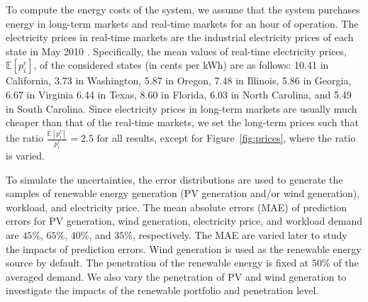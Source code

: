 To compute the energy costs of the system, we assume that the system
purchases energy in long-term markets and real-time markets for an
hour of operation. The
electricity prices in real-time markets are the industrial electricity
prices of each state in May 2010 \cite{eia2015}. Specifically, the
mean values of real-time electricity prices, $\mathbb{E}[p^r_i]$, of
the considered states (in cents per kWh) are as follows: 10.41 in
California, 3.73 in Washington, 5.87 in Oregon, 7.48 in Illinois, 5.86
in Georgia, 6.67 in Virginia 6.44 in Texas, 8.60 in Florida, 6.03 in
North Carolina, and 5.49 in South Carolina. Since electricity prices
in long-term markets are usually much cheaper than that of the
real-time markets, we set the long-term prices such that the ratio
$\frac{\mathbb{E}[p^r_i]}{p^l_i }=2.5$ for all results, except for
Figure~\ref{fig:prices}, where the ratio is varied.


To simulate the uncertainties, the error distributions  are used to generate
the samples of renewable energy generation (PV generation and/or wind
generation), workload, and electricity price. The mean absolute errors
(MAE) of prediction errors for PV generation, wind generation,
electricity price, and workload demand are $45\%$, $65\%$, $40\%$, and
$35\%$, respectively. The MAE are varied later to study the impacts of
prediction errors. Wind generation is used as the renewable energy
source by default. The penetration of the renewable energy is fixed at
$50\%$ of the averaged demand. We also vary the penetration of PV and
wind generation to investigate the impacts of the renewable portfolio
and penetration level.

